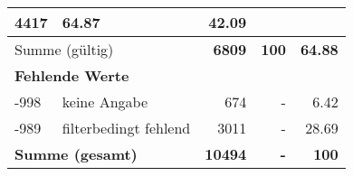 \begin{longtable}{lXrrr}
       \num{4417} &
       \num[round-mode=places,round-precision=2]{64,87} &
         \num[round-mode=places,round-precision=2]{42,09} \\
     \midrule
     \multicolumn{2}{l}{Summe (gültig)} &
       \textbf{\num{6809}} &
     \textbf{100} &
       \textbf{\num[round-mode=places,round-precision=2]{64,88}} \\
     \multicolumn{5}{l}{\textbf{Fehlende Werte}}\\
       -998 &
       keine Angabe &
         \num{674} &
        - &
         \num[round-mode=places,round-precision=2]{6,42} \\
       -989 &
       filterbedingt fehlend &
         \num{3011} &
        - &
         \num[round-mode=places,round-precision=2]{28,69} \\
     \midrule
     \multicolumn{2}{l}{\textbf{Summe (gesamt)}} &
          \textbf{\num{10494}} &
        \textbf{-} &
        \textbf{100} \\
     \bottomrule
     \end{longtable}
     

